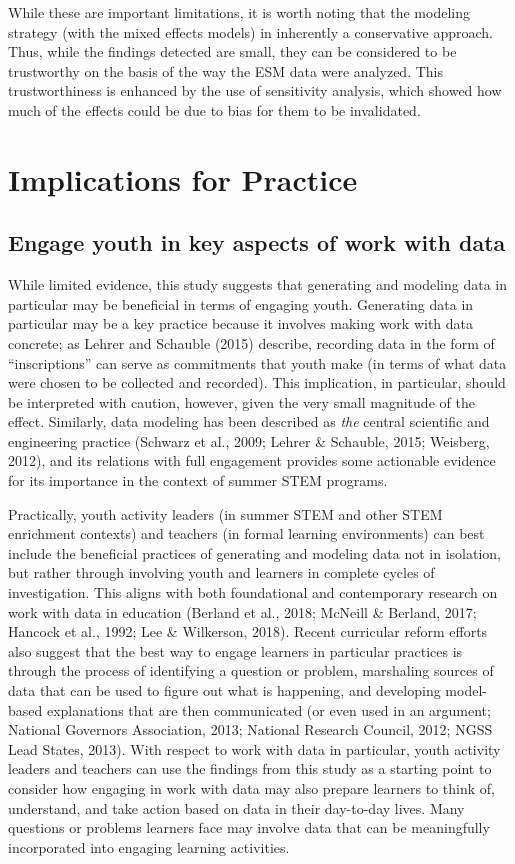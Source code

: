 \documentclass[]{msu-thesis}
\theoremstyle{definition}
\theoremstyle{definition}
\theoremstyle{definition}
\theoremstyle{remark}
\begin{document}
While these are important limitations, it is worth noting that the
modeling strategy (with the mixed effects models) in inherently a
conservative approach. Thus, while the findings detected are small, they
can be considered to be trustworthy on the basis of the way the ESM data
were analyzed. This trustworthiness is enhanced by the use of
sensitivity analysis, which showed how much of the effects could be due
to bias for them to be invalidated.

\section{Implications for Practice}\label{implications-for-practice}

\subsection{Engage youth in key aspects of work with
data}\label{engage-youth-in-key-aspects-of-work-with-data}

While limited evidence, this study suggests that generating and modeling
data in particular may be beneficial in terms of engaging youth.
Generating data in particular may be a key practice because it involves
making work with data concrete; as Lehrer and Schauble (2015) describe,
recording data in the form of ``inscriptions'' can serve as commitments
that youth make (in terms of what data were chosen to be collected and
recorded). This implication, in particular, should be interpreted with
caution, however, given the very small magnitude of the effect.
Similarly, data modeling has been described as \emph{the} central
scientific and engineering practice (Schwarz et al., 2009; Lehrer \&
Schauble, 2015; Weisberg, 2012), and its relations with full engagement
provides some actionable evidence for its importance in the context of
summer STEM programs.

Practically, youth activity leaders (in summer STEM and other STEM
enrichment contexts) and teachers (in formal learning environments) can
best include the beneficial practices of generating and modeling data
not in isolation, but rather through involving youth and learners in
complete cycles of investigation. This aligns with both foundational and
contemporary research on work with data in education (Berland et al.,
2018; McNeill \& Berland, 2017; Hancock et al., 1992; Lee \& Wilkerson,
2018). Recent curricular reform efforts also suggest that the best way
to engage learners in particular practices is through the process of
identifying a question or problem, marshaling sources of data that can
be used to figure out what is happening, and developing model-based
explanations that are then communicated (or even used in an argument;
National Governors Association, 2013; National Research Council, 2012;
NGSS Lead States, 2013). With respect to work with data in particular,
youth activity leaders and teachers can use the findings from this study
as a starting point to consider how engaging in work with data may also
prepare learners to think of, understand, and take action based on data
in their day-to-day lives. Many questions or problems learners face may
involve data that can be meaningfully incorporated into engaging
learning activities.
\end{document}
